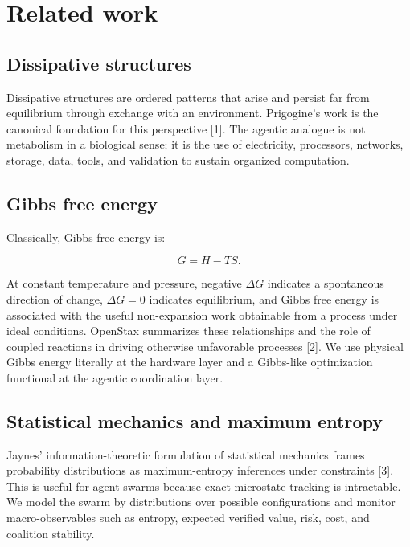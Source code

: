 \documentclass[11pt]{article}
\begin{document}
\section{Related work}\label{related-work}

\subsection{Dissipative structures}\label{dissipative-structures}

Dissipative structures are ordered patterns that arise and persist far from equilibrium through exchange with an environment. Prigogine's work is the canonical foundation for this perspective {[}1{]}. The agentic analogue is not metabolism in a biological sense; it is the use of electricity, processors, networks, storage, data, tools, and validation to sustain organized computation.

\subsection{Gibbs free energy}\label{gibbs-free-energy}

Classically, Gibbs free energy is:

\[
G=H-TS.
\]

At constant temperature and pressure, negative \(\Delta G\) indicates a spontaneous direction of change, \(\Delta G=0\) indicates equilibrium, and Gibbs free energy is associated with the useful non-expansion work obtainable from a process under ideal conditions. OpenStax summarizes these relationships and the role of coupled reactions in driving otherwise unfavorable processes {[}2{]}. We use physical Gibbs energy literally at the hardware layer and a Gibbs-like optimization functional at the agentic coordination layer.

\subsection{Statistical mechanics and maximum entropy}\label{statistical-mechanics-and-maximum-entropy}

Jaynes' information-theoretic formulation of statistical mechanics frames probability distributions as maximum-entropy inferences under constraints {[}3{]}. This is useful for agent swarms because exact microstate tracking is intractable. We model the swarm by distributions over possible configurations and monitor macro-observables such as entropy, expected verified value, risk, cost, and coalition stability.
\end{document}
